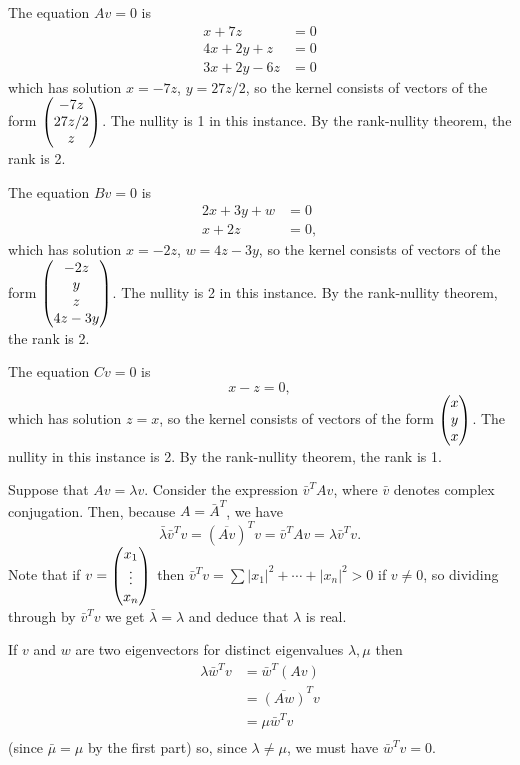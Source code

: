 \documentclass{article}
\begin{document}
\begin{Solution}
The equation \(Av=0\) is
\begin{align*}
x+7z&=0\\
4x+2y+z&=0\\
3x+2y-6z&=0
\end{align*}
which has solution \(x=-7z\), \(y=27z/2\), so the kernel consists of
vectors of the form \(\begin{pmatrix} -7z \\ 27z/2 \\ z\end{pmatrix}\). The nullity is 1
in this instance. By the rank-nullity theorem, the rank is 2.


The equation \(Bv=0\) is
\begin{align*}
2x+3y+w&=0\\
x+2z&=0,
\end{align*}
which has solution \(x=-2z\), \(w=4z-3y\), so the kernel consists of
vectors of the form \(\begin{pmatrix} -2z \\ y \\ z \\ 4z-3y\end{pmatrix}\). The nullity
is 2 in this instance. By the rank-nullity theorem, the rank is 2.


The equation \(Cv=0\) is
\[x-z=0,\]
which has solution \(z=x\), so the kernel consists of vectors of the
form \(\begin{pmatrix} x \\ y \\ x\end{pmatrix}\). The nullity in this instance is 2. By
the rank-nullity theorem, the rank is 1.


\end{Solution}
\begin{Solution}\label{sol:exr:hermitian}
Suppose that \(Av=\lambda v\). Consider the expression
\(\bar{v}^TAv\), where \(\bar{v}\) denotes complex
conjugation. Then, because \(A=\bar{A}^T\), we have
\[\bar{\lambda}\bar{v}^Tv=(\overline{Av})^{T}v=\bar{v}^TAv=\lambda\bar{v}^Tv.\]
Note that if \(v=\begin{pmatrix} x_1\\ \vdots\\ x_n\end{pmatrix}\) then
\(\bar{v}^Tv=\sum |x_1|^2+\cdots+|x_n|^2>0\) if \(v\neq 0\), so
dividing through by \(\bar{v}^Tv\) we get \(\bar{\lambda}=\lambda\)
and deduce that \(\lambda\) is real.


If \(v\) and \(w\) are two eigenvectors for distinct eigenvalues
\(\lambda,\mu\) then
\begin{align*}
\lambda \bar{w}^Tv&=\bar{w}^T(Av)\\
&=\overline{(Aw)}^Tv\\
&=\mu \bar{w}^Tv\\
\end{align*}
(since \(\bar{\mu}=\mu\) by the first part) so, since
\(\lambda\neq\mu\), we must have \(\bar{w}^Tv=0\). \qedhere


\end{Solution}
\end{document}
